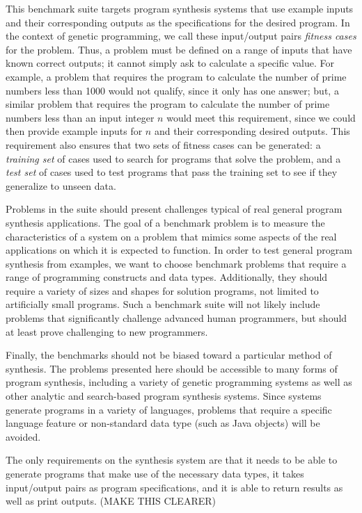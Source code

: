 \documentclass{sig-alternate}
\begin{document}
This benchmark suite targets program synthesis systems that use example inputs and their corresponding outputs as the specifications for the desired program. In the context of genetic programming, we call these input/output pairs \textit{fitness cases} for the problem. Thus, a problem must be defined on a range of inputs that have known correct outputs; it cannot simply ask to calculate a specific value. For example, a problem that requires the program to calculate the number of prime numbers less than 1000 would not qualify, since it only has one answer; but, a similar problem that requires the program to calculate the number of prime numbers less than an input integer $n$ would meet this requirement, since we could then provide example inputs for $n$ and their corresponding desired outputs. This requirement also ensures that two sets of fitness cases can be generated: a \textit{training set} of cases used to search for programs that solve the problem, and a \textit{test set} of cases used to test programs that pass the training set to see if they generalize to unseen data.

Problems in the suite should present challenges typical of real general program synthesis applications. The goal of a benchmark problem is to measure the characteristics of a system on a problem that mimics some aspects of the real applications on which it is expected to function. In order to test general program synthesis from examples, we want to choose benchmark problems that require a range of programming constructs and data types. Additionally, they should require a variety of sizes and shapes for solution programs, not limited to artificially small programs. Such a benchmark suite will not likely include problems that significantly challenge advanced human programmers, but should at least prove challenging to new programmers.

Finally, the benchmarks should not be biased toward a particular method of synthesis. The problems presented here should be accessible to many forms of program synthesis, including a variety of genetic programming systems as well as other analytic and search-based program synthesis systems. Since systems generate programs in a variety of languages, problems that require a specific language feature or non-standard data type (such as Java objects) will be avoided.

The only requirements on the synthesis system are that it needs to be able to generate programs that make use of the necessary data types, it takes input/output pairs as program specifications, and it is able to return results as well as print outputs. (MAKE THIS CLEARER)
\end{document}

